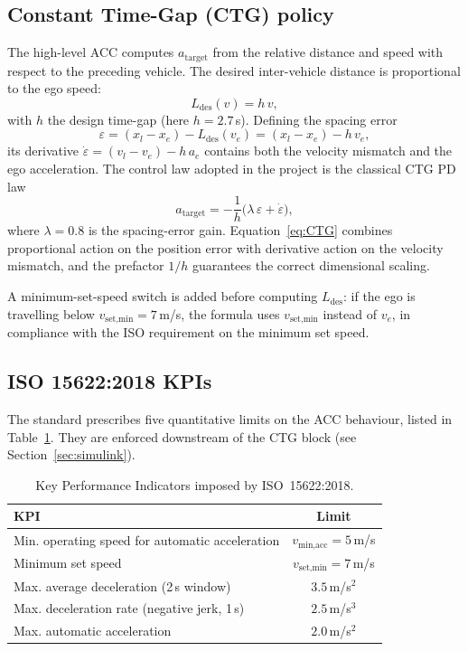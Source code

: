 \subsection{Constant Time-Gap (CTG) policy}
The high-level ACC computes $a_\text{target}$ from the relative
distance and speed with respect to the preceding vehicle. The desired
inter-vehicle distance is proportional to the ego speed:
\begin{equation}
    L_\text{des}(v) = h\,v,
    \label{eq:Ldes}
\end{equation}
with $h$ the design time-gap (here $h=2.7$\,s). Defining the spacing
error
\begin{equation}
    \varepsilon = (x_l - x_e) - L_\text{des}(v_e)
                = (x_l - x_e) - h\,v_e,
    \label{eq:eps}
\end{equation}
its derivative $\dot\varepsilon = (v_l - v_e) - h\,a_e$ contains both
the velocity mismatch and the ego acceleration. The control law adopted
in the project is the classical CTG PD law
\begin{equation}
    a_\text{target} = -\frac{1}{h}\bigl(\lambda\,\varepsilon + \dot\varepsilon\bigr),
    \label{eq:CTG}
\end{equation}
where $\lambda = 0.8$ is the spacing-error gain. Equation~\eqref{eq:CTG}
combines proportional action on the position error with derivative
action on the velocity mismatch, and the prefactor $1/h$ guarantees the
correct dimensional scaling.

A minimum-set-speed switch is added before computing $L_\text{des}$:
if the ego is travelling below $v_\text{set,min}=7$\,m/s, the formula
uses $v_\text{set,min}$ instead of $v_e$, in compliance with the ISO
requirement on the minimum set speed.

\subsection{ISO 15622:2018 KPIs}
The standard prescribes five quantitative limits on the ACC behaviour,
listed in Table~\ref{tab:iso}. They are enforced downstream of the
CTG block (see Section~\ref{sec:simulink}).

\begin{table}[H]
    \centering
    \begin{tabular}{lc}
        \toprule
        \textbf{KPI} & \textbf{Limit} \\
        \midrule
        Min. operating speed for automatic acceleration & $v_\text{min,acc} = 5$\,m/s \\
        Minimum set speed                               & $v_\text{set,min} = 7$\,m/s \\
        Max. average deceleration (2\,s window)         & $3.5$\,m/s$^2$ \\
        Max. deceleration rate (negative jerk, 1\,s)    & $2.5$\,m/s$^3$ \\
        Max. automatic acceleration                     & $2.0$\,m/s$^2$ \\
        \bottomrule
    \end{tabular}
    \caption{Key Performance Indicators imposed by ISO~15622:2018.}
    \label{tab:iso}
\end{table}

